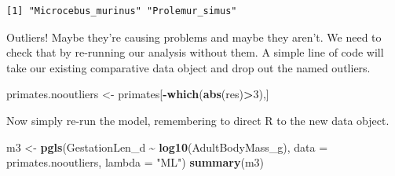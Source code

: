 \documentclass[
]{book}
\newenvironment{Shaded}{\begin{snugshade}}{\end{snugshade}}
\newcommand{\DataTypeTok}[1]{\textcolor[rgb]{0.13,0.29,0.53}{#1}}
\newcommand{\DecValTok}[1]{\textcolor[rgb]{0.00,0.00,0.81}{#1}}
\newcommand{\KeywordTok}[1]{\textcolor[rgb]{0.13,0.29,0.53}{\textbf{#1}}}
\newcommand{\NormalTok}[1]{#1}
\newcommand{\OperatorTok}[1]{\textcolor[rgb]{0.81,0.36,0.00}{\textbf{#1}}}
\newcommand{\StringTok}[1]{\textcolor[rgb]{0.31,0.60,0.02}{#1}}
\begin{document}
\begin{Shaded}
\end{Shaded}

\begin{verbatim}
[1] "Microcebus_murinus" "Prolemur_simus"    
\end{verbatim}

Outliers! Maybe they're causing problems and maybe they aren't. We need to check that by re-running our analysis without them. A simple line of code will take our existing comparative data object and drop out the named outliers.

\begin{Shaded}
\begin{Highlighting}[]
\NormalTok{primates.nooutliers \textless{}{-}}\StringTok{ }\NormalTok{primates[}\OperatorTok{{-}}\KeywordTok{which}\NormalTok{(}\KeywordTok{abs}\NormalTok{(res)}\OperatorTok{\textgreater{}}\DecValTok{3}\NormalTok{),]}
\end{Highlighting}
\end{Shaded}

Now simply re-run the model, remembering to direct R to the new data object.

\begin{Shaded}
\begin{Highlighting}[]
\NormalTok{m3 \textless{}{-}}\StringTok{ }\KeywordTok{pgls}\NormalTok{(GestationLen\_d }\OperatorTok{\textasciitilde{}}\StringTok{ }\KeywordTok{log10}\NormalTok{(AdultBodyMass\_g),}
           \DataTypeTok{data =}\NormalTok{ primates.nooutliers, }\DataTypeTok{lambda =} \StringTok{"ML"}\NormalTok{)}
\KeywordTok{summary}\NormalTok{(m3)}
\end{Highlighting}
\end{Shaded}
\end{document}
